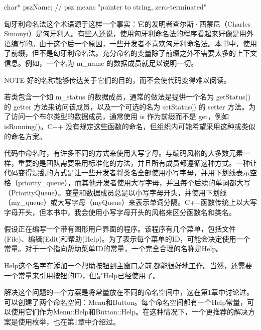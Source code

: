 \begin{cpp}
char* pszName; // psz means "pointer to string, zero-terminated"
\end{cpp}

匈牙利命名法这个术语源于这样一个事实：它的发明者查尔斯·西蒙尼（Charles Simonyi）是匈牙利人。有些人还说，使用匈牙利命名法的程序看起来好像是用外语编写的。由于这个后一个原因，一些开发者不喜欢匈牙利命名法。本书中，使用了前缀，但不是匈牙利命名法。充分命名的变量除了前缀之外不需要太多的上下文信息。例如，一个名为 m\_name 的数据成员就足以说明一切。

\begin{myNotic}{NOTE}
好的名称能够传达关于它们的目的，而不会使代码变得难以阅读。
\end{myNotic}


若类包含一个如 m\_status 的数据成员，通常的做法是提供一个名为 getStatus() 的 getter 方法来访问该成员，以及一个可选的名为 setStatus() 的 setter 方法。为了访问一个布尔类型的数据成员，通常使用 is 作为前缀而不是 get，例如 isRunning()。C++ 没有规定这些函数的命名，但组织内可能希望采用这种或类似的命名方案。


代码中命名时，有许多不同的方式来使用大写字母。与编码风格的大多数元素一样，重要的是团队需要采用标准化的方法，并且所有成员都遵循这种方式。一种让代码变得混乱的方式是让一些开发者将类名全部使用小写字母，并用下划线表示空格（priority\_queue），而其他开发者使用大写字母，并且每个后续的单词都大写（PriorityQueue）。变量和数据成员总是以小写字母开头，并使用下划线（my\_queue）或大写字母（myQueue）来表示单词分隔。C++函数传统上以大写字母开头，但本书中，我会使用小写字母开头的风格来区分函数名和类名。


假设正在编写一个带有图形用户界面的程序。该程序有几个菜单，包括文件(File)、编辑(Edit)和帮助(Help)。为了表示每个菜单的ID，可能会决定使用一个常量。对于一个指向帮助菜单ID的常量，一个完全合理的名称是Help。

Help这个名字在添加一个帮助按钮到主窗口之前,都能很好地工作。当然，还需要一个常量来引用按钮的ID，但是Help已经使用了。

解决这个问题的一个方案是将常量放在不同的命名空间中，这在第1章中讨论过。可以创建了两个命名空间：Menu和Button。每个命名空间都有一个Help常量，可以使用它们作为Menu::Help和Button::Help。在这种情况下，一个更推荐的解决方案是使用枚举，也在第1章中介绍过。


